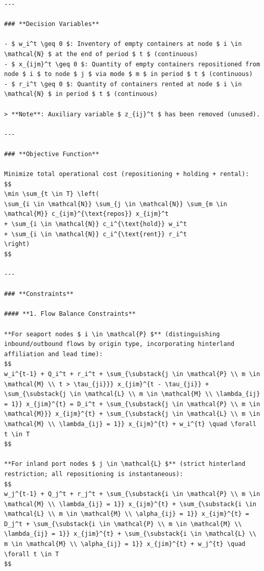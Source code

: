 \documentclass[preprint,12pt]{elsarticle}
\begin{document}
\begin{nolinenumbers}
\begin{promptbox}
\begin{lstlisting}[style=prompttemplate]
---

### **Decision Variables**

- $ w_i^t \geq 0 $: Inventory of empty containers at node $ i \in \mathcal{N} $ at the end of period $ t $ (continuous)
- $ x_{ijm}^t \geq 0 $: Quantity of empty containers repositioned from node $ i $ to node $ j $ via mode $ m $ in period $ t $ (continuous)
- $ r_i^t \geq 0 $: Quantity of containers rented at node $ i \in \mathcal{N} $ in period $ t $ (continuous)

> **Note**: Auxiliary variable $ z_{ij}^t $ has been removed (unused).

---

### **Objective Function**

Minimize total operational cost (repositioning + holding + rental):
$$
\min \sum_{t \in T} \left(
\sum_{i \in \mathcal{N}} \sum_{j \in \mathcal{N}} \sum_{m \in \mathcal{M}} c_{ijm}^{\text{repos}} x_{ijm}^t
+ \sum_{i \in \mathcal{N}} c_i^{\text{hold}} w_i^t
+ \sum_{i \in \mathcal{N}} c_i^{\text{rent}} r_i^t
\right)
$$

---

### **Constraints**

#### **1. Flow Balance Constraints**

**For seaport nodes $ i \in \mathcal{P} $** (distinguishing inbound/outbound flows by origin type, incorporating hinterland affiliation and lead time):
$$
w_i^{t-1} + Q_i^t + r_i^t + \sum_{\substack{j \in \mathcal{P} \\ m \in \mathcal{M} \\ t > \tau_{ji}}} x_{jim}^{t - \tau_{ji}} + \sum_{\substack{j \in \mathcal{L} \\ m \in \mathcal{M} \\ \lambda_{ij} = 1}} x_{jim}^{t} = D_i^t + \sum_{\substack{j \in \mathcal{P} \\ m \in \mathcal{M}}} x_{ijm}^{t} + \sum_{\substack{j \in \mathcal{L} \\ m \in \mathcal{M} \\ \lambda_{ij} = 1}} x_{ijm}^{t} + w_i^{t} \quad \forall t \in T
$$

**For inland port nodes $ j \in \mathcal{L} $** (strict hinterland restriction; all repositioning is instantaneous):
$$
w_j^{t-1} + Q_j^t + r_j^t + \sum_{\substack{i \in \mathcal{P} \\ m \in \mathcal{M} \\ \lambda_{ij} = 1}} x_{ijm}^{t} + \sum_{\substack{i \in \mathcal{L} \\ m \in \mathcal{M} \\ \alpha_{ij} = 1}} x_{ijm}^{t} = D_j^t + \sum_{\substack{i \in \mathcal{P} \\ m \in \mathcal{M} \\ \lambda_{ij} = 1}} x_{jim}^{t} + \sum_{\substack{i \in \mathcal{L} \\ m \in \mathcal{M} \\ \alpha_{ij} = 1}} x_{jim}^{t} + w_j^{t} \quad \forall t \in T
$$


\end{lstlisting}
\end{promptbox}
\end{nolinenumbers}
\end{document}
